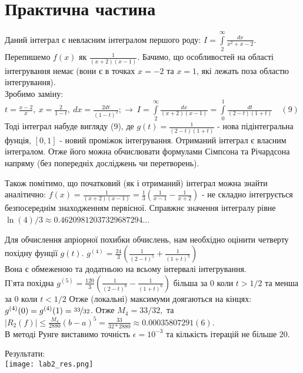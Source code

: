 \documentclass[12pt]{extarticle}
\newcommand{\<}{\langle}
\renewcommand{\>}{\rangle}
\theoremstyle{definition}
\begin{document}
\vspace{1cm}

\section{Практична частина}

Даний інтеграл є невласним інтегралом першого роду: $I = \int\limits_{2}^{\infty}\frac{dx}{x^2+x-2}$.
Перепишемо $f(x)$ як $\frac{1}{(x+2)(x-1)}$. Бачимо, що особливостей на області інтегрування немає (вони є в точках $x=-2$ та $x=1$, які лежать поза областю інтегрування). \\
Зробимо заміну: $t = \frac{x-2}{x},\ x=\frac{2}{1-t}, \ dx = \frac{2dt}{(1-t)^2}; \rightarrow \ I=\int\limits_{2}^{\infty}\frac{dx}{(x+2)(x-1)} = \int\limits_{0}^{1}\frac{dt}{(2-t)(1+t)} \quad (9)$ \\
Тоді інтеграл набуде вигляду (9), де $g(t) = \frac{1}{(2-t)(1+t)}$ - нова підінтегральна фунція, $[0,1]$ - новий проміжок інтегрування.
Отриманий інтеграл є власним інтегралом. Отже його можна обчислювати формулами Сімпсона та Річардсона напряму (без попередніх досліджень чи перетворень).

Також помітимо, що початковий (як і отриманий) інтеграл можна знайти аналітично: $f(x) = \frac{1}{(x+2)(x-1)} = \frac{1}{3}\left(\frac{1}{x-1} - \frac{1}{x+2}\right)$ - не складно інтегрується безпосереднім знаходженням первісної. Справжнє значення інтегралу рівне $\ln(4)/3 \approx 0.46209812037329687294..$.


Для обчислення апріорної похибки обчислень, нам необхідно оцінити четверту похідну фунції $g(t)$.
$g^{(4)}=\frac{24}{3}\left( \frac{1}{(2-t)^5} + \frac{1}{(1+t)^5}\right)$ \\
Вона є обмеженою та додатньою на всьому інтервалі інтегрування.\\
П'ята похідна $g^{(5)}=\frac{120}{3}\left( \frac{1}{(2-t)^6} - \frac{1}{(1+t)^6}\right)$
більша за 0 коли $t>1/2$ та менша за 0 коли $t<1/2$
Отже (локальні) максимуми доягаються на кінцях: $g^{(4)}(0)=g^{(4)}(1)=\nicefrac{33}{32}$.
Отже $M_4 = 33/32, $ та $|R_{2}(f)|\leq \frac{M_{4}}{2880}(b-a)^{5} = \frac{33}{32*2880} \approx 0.00035807291(6)$.\\
В методі Рунге виставимо точність $\epsilon = 10^{-3}$ та кількість ітерацій не більше 20. 

Результати:\\
\texttt{[image: lab2\_res.png]}
\end{document}
